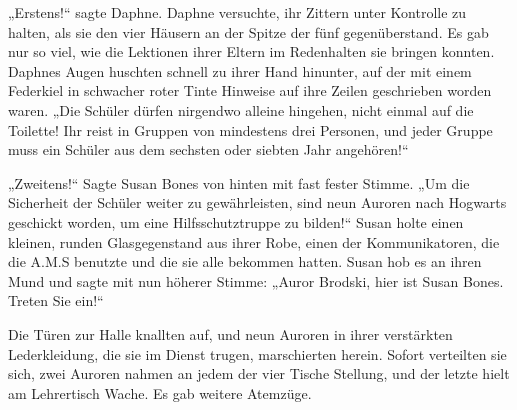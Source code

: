 \later

„Erstens!“ sagte Daphne. Daphne versuchte, ihr Zittern unter Kontrolle zu halten, als sie den vier Häusern an der Spitze der fünf gegenüberstand. Es gab nur so viel, wie die Lektionen ihrer Eltern im Redenhalten sie bringen konnten. Daphnes Augen huschten schnell zu ihrer Hand hinunter, auf der mit einem Federkiel in schwacher roter Tinte Hinweise auf ihre Zeilen geschrieben worden waren.
„Die Schüler dürfen nirgendwo alleine hingehen, nicht einmal auf die Toilette! Ihr reist in Gruppen von mindestens drei Personen, und jeder Gruppe muss ein Schüler aus dem sechsten oder siebten Jahr angehören!“

„Zweitens!“ Sagte Susan Bones von hinten mit fast fester Stimme. „Um die Sicherheit der Schüler weiter zu gewährleisten, sind neun Auroren nach Hogwarts geschickt worden, um eine Hilfsschutztruppe zu bilden!“
Susan holte einen kleinen, runden Glasgegenstand aus ihrer Robe, einen der Kommunikatoren, die die A.M.S benutzte und die sie alle bekommen hatten. Susan hob es an ihren Mund und sagte mit nun höherer Stimme: „Auror Brodski, hier ist Susan Bones. Treten Sie ein!“

Die Türen zur Halle knallten auf, und neun Auroren in ihrer verstärkten Lederkleidung, die sie im Dienst trugen, marschierten herein. Sofort verteilten sie sich, zwei Auroren nahmen an jedem der vier Tische Stellung, und der letzte hielt am Lehrertisch Wache. Es gab weitere Atemzüge.

